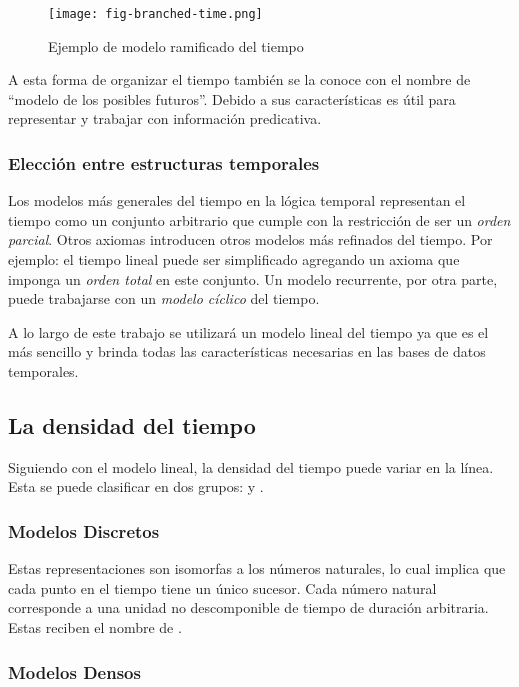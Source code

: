 \begin{figure}
    \centering
    \texttt{[image: fig-branched-time.png]}
    \caption{Ejemplo de modelo ramificado del tiempo}
    \label{fig:branched-time-model}
\end{figure}

A esta forma de organizar el tiempo también se la conoce con el nombre de “modelo de los posibles futuros”.
Debido a sus características es útil para representar y trabajar con información predicativa.

\subsubsection{Elección entre estructuras temporales}

Los modelos más generales del tiempo en la lógica temporal representan el tiempo como un conjunto arbitrario
que cumple con la restricción de ser un \textit{orden parcial}.
Otros axiomas introducen otros modelos más refinados del tiempo.
Por ejemplo: el tiempo lineal puede ser simplificado agregando un axioma que imponga un \textit{orden total} en este conjunto.
Un modelo recurrente, por otra parte, puede trabajarse con un \textit{modelo cíclico} del tiempo.

A lo largo de este trabajo se utilizará un modelo lineal del tiempo ya que es el más sencillo
y brinda todas las características necesarias en las bases de datos temporales.

\subsection{La densidad del tiempo}

Siguiendo con el modelo lineal, la densidad del tiempo puede variar en la línea.
Esta se puede clasificar en dos grupos:  y .

\subsubsection{Modelos Discretos}

Estas representaciones son isomorfas a los números naturales, lo cual implica que cada punto en el tiempo tiene un único sucesor.
Cada número natural corresponde a una unidad no descomponible de tiempo de duración arbitraria.
Estas reciben el nombre de .

\subsubsection{Modelos Densos}

